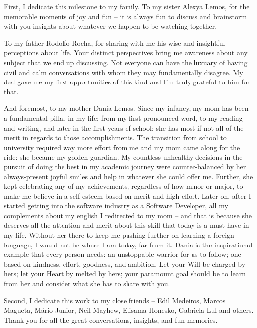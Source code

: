 First, I dedicate this milestone to my family. To my sister Alexya Lemos, for the memorable moments of joy and fun -- it is always fun to
discuss and brainstorm with you insights about whatever we happen to be watching together.

To my father Rodolfo Rocha, for sharing with me his wise and insightful perceptions about life.
Your distinct perspectives bring me awareness about any subject that we end up
discussing. Not everyone can have the luxuary of having
civil and calm conversations with whom they may fundamentally disagree. My dad gave me my first
opportunities of this kind and I'm truly grateful to him for that.

And foremost, to my mother Dania Lemos. Since my infancy, my mom has been a fundamental pillar in my life;
from my first pronounced word, to my reading and writing, and later in the first years of school; she has most if not
all of the merit in regards to those accomplishments. The transition from school to university required way more effort
from me and my mom came along for the ride: she became my golden guardian. My countless unhealthy decisions in the pursuit
of doing the best in my academic journey were counter-balanced by her always-present joyful smiles and help in whatever
she could offer me. Further, she kept celebrating any of my achievements, regardless of how minor or major, to make me
believe in a self-esteem based on merit and high effort. Later on, after I started getting into the software industry
as a Software Developer, all my complements about my english I redirected to my mom -- and that is because she deserves
all the attention and merit about this skill that today is a must-have in my life. Without her there to keep me pushing
further on learning a foreign language, I would not be where I am today, far from it. Dania is the inspirational example that every
person needs: an unstoppable warrior for us to follow; one based on kindness, effort, goodness, and ambition. Let your Will
be charged by hers; let your Heart by melted by hers; your paramount goal should be to learn from her and consider what
she has to share with you.

Second, I dedicate this work to my close friends -- Edil Medeiros, Marcos Magueta, Mário Junior, Neil Mayhew,
Elisama Honesko, Gabriela Lul and others. Thank you for
all the great conversations, insights, and fun memories.
